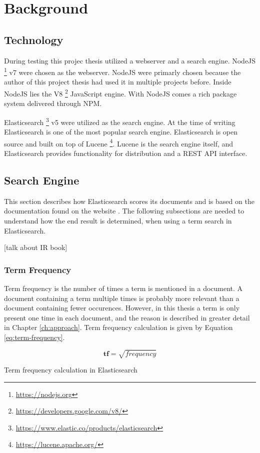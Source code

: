 \chapter{Background}
\label{ch:background}

\section{Technology}
During testing this projec thesis utilized a webserver and a search engine.
NodeJS \footnote{\url{https://nodejs.org}} v7 were chosen as the webserver.
NodeJS were primarly chosen because the author of this project thesis had used it in multiple projects before.
Inside NodeJS lies the V8 \footnote{\url{https://developers.google.com/v8/}} JavaScript engine.
With NodeJS comes a rich package system delivered through NPM.

Elasticsearch \footnote{\url{https://www.elastic.co/products/elasticsearch}} v5 were utilized as the search engine.
At the time of writing Elasticsearch is one of the most popular search engine.
Elasticsearch is open source and built on top of Lucene \footnote{\url{https://lucene.apache.org/}}.
Lucene is the search engine itself,
and Elasticsearch provides functionality for distribution and a REST API interface.

\section{Search Engine}
This section describes how Elasticsearch scores its documents and is based on the documentation found on the website \cite{elasticsearch-scoring}.
The following subsections are needed to understand how the end result is determined, when using a term search in Elasticsearch.

[talk about IR book] \cite{ir-book}

\subsection{Term Frequency}
Term frequency is the number of times a term is mentioned in a document.
A document containing a term multiple times is probably more relevant than a document containing fewer occurences.
However, in this thesis a term is only present one time in each document, and the reason is described in greater detail in Chapter \ref{ch:approach}.
Term frequency calculation is given by Equation \ref{eq:term-frequency}.

\begin{cequation}[H]
	\begin{equation}
		\mathbf{tf} = \sqrt{frequency}
	\end{equation}
	\caption{Term frequency calculation in Elasticsearch}
  \label{eq:term-frequency}
\end{cequation}

